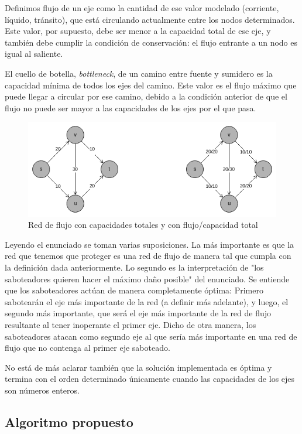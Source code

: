 \documentclass{article}
\begin{document}
Definimos flujo de un eje como la cantidad de ese valor modelado (corriente, líquido, tránsito), que está circulando actualmente entre los nodos determinados. Este valor, por supuesto, debe ser menor a la capacidad total de ese eje, y también debe cumplir la condición de conservación: el flujo entrante a un nodo es igual al saliente.

El cuello de botella, \textit{bottleneck}, de un camino entre fuente y sumidero es la capacidad mínima de todos los ejes del camino. Este valor es el flujo máximo que puede llegar a circular por ese camino, debido a la condición anterior de que el flujo no puede ser mayor a las capacidades de los ejes por el que pasa.

\begin{figure}
    \centering
    \includegraphics[scale=0.5]{res/flow_network.png}
    \caption{Red de flujo con capacidades totales y con flujo/capacidad total}
\end{figure}

Leyendo el enunciado se toman varias suposiciones. La más importante es que la red que tenemos que proteger es una red de flujo de manera tal que cumpla con la definición dada anteriormente. Lo segundo es la interpretación de "los saboteadores quieren hacer el máximo daño posible" del enunciado. Se entiende que los saboteadores actúan de manera completamente óptima: Primero sabotearán el eje más importante de la red (a definir más adelante), y luego, el segundo más importante, que será el eje más importante de la red de flujo resultante al tener inoperante el primer eje. Dicho de otra manera, los saboteadores atacan como segundo eje al que sería más importante en una red de flujo que no contenga al primer eje saboteado.

No está de más aclarar también que la solución implementada es óptima y termina con el orden determinado únicamente cuando las capacidades de los ejes son números enteros. 

\subsection{Algoritmo propuesto}
\end{document}
